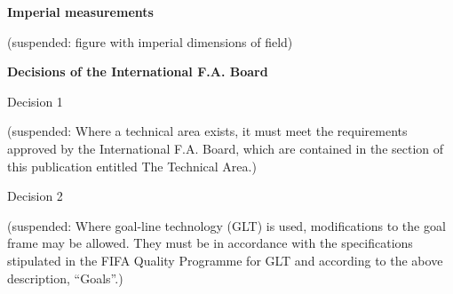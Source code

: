 \bigskip

{\bfseries Imperial measurements}

\headlinebox 

\textcolor[rgb]{0.4,0.4,0.4}{(suspended: figure with imperial dimensions of field)}

\clearpage

{\bfseries Decisions of the International F.A. Board}

\headlinebox 

Decision 1

{\color[rgb]{0.4,0.4,0.4}
(suspended: Where a technical area exists, it must meet the requirements approved by the International F.A. Board, which are contained in the section of this publication entitled The Technical Area.)}

\bigskip

Decision 2

{\color[rgb]{0.4,0.4,0.4}
(suspended: Where goal-line technology (GLT) is used, modifications to the goal frame may be allowed. They must be in accordance with the specifications stipulated in the FIFA Quality Programme for GLT and according to the above description, ``Goals''.) }
